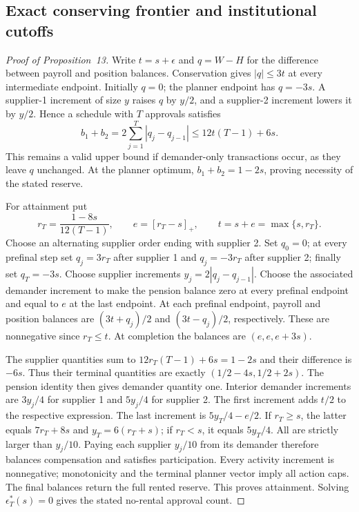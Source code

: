 \documentclass[ecta,draft,supplement]{econsocart}
\theoremstyle{definition}
\theoremstyle{definition}
\begin{document}
\begin{appendix}
\subsection{Exact conserving frontier and institutional cutoffs}
\label{app:standingexact}

\begin{proof}[Proof of Proposition~13%
]
Write $t=s+\epsilon$ and $q=W-H$ for the difference between
payroll and position balances. Conservation gives $|q|\leq3t$
at every intermediate endpoint. Initially $q=0$; the planner
endpoint has $q=-3s$. A supplier-1 increment of size $y$ raises
$q$ by $y/2$, and a supplier-2 increment lowers it by $y/2$.
Hence a schedule with $T$ approvals satisfies
\[
 b_1+b_2=2\sum_{j=1}^T|q_j-q_{j-1}|
       \leq12t(T-1)+6s.
\]
This remains a valid upper bound if demander-only transactions
occur, as they leave $q$ unchanged. At the planner optimum,
$b_1+b_2=1-2s$, proving necessity of the stated reserve.

For attainment put
\[
 r_T=\frac{1-8s}{12(T-1)},\qquad
 e=[r_T-s]_+,\qquad t=s+e=\max\{s,r_T\}.
\]
Choose an alternating supplier order ending with supplier 2.
Set $q_0=0$; at every prefinal step set $q_j=3r_T$ after
supplier 1 and $q_j=-3r_T$ after supplier 2; finally set
$q_T=-3s$. Choose supplier increments
$y_j=2|q_j-q_{j-1}|$. Choose the associated demander increment
to make the pension balance zero at every prefinal endpoint
and equal to $e$ at the last endpoint. At each prefinal endpoint,
payroll and position balances are $(3t+q_j)/2$ and
$(3t-q_j)/2$, respectively. These are nonnegative since
$r_T\leq t$. At completion the balances are $(e,e,e+3s)$.

The supplier quantities sum to
$12r_T(T-1)+6s=1-2s$ and their difference is $-6s$.
Thus their terminal quantities are exactly
$(1/2-4s,1/2+2s)$. The pension identity then gives demander
quantity one. Interior demander increments are $3y_j/4$ for
supplier 1 and $5y_j/4$ for supplier 2. The first increment
adds $t/2$ to the respective expression. The last increment is
$5y_T/4-e/2$. If $r_T\geq s$, the latter equals
$7r_T+8s$ and $y_T=6(r_T+s)$; if $r_T<s$, it equals
$5y_T/4$. All are strictly larger than $y_j/10$.
Paying each supplier $y_j/10$ from its demander therefore
balances compensation and satisfies participation. Every
activity increment is nonnegative; monotonicity and the terminal
planner vector imply all action caps. The final balances return
the full rented reserve. This proves attainment. Solving
$\epsilon_T^*(s)=0$ gives the stated no-rental approval count.
\end{proof}


\end{appendix}
\end{document}
